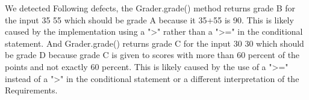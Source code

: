 \begin{parlist}
\item
We detected Following defects, the Grader.grade() method returns grade B for the input 35 55 which should be grade
A because it 35+55 is 90. This is likely caused by the implementation using a ">" rather than a ">=" in the conditional statement. And Grader.grade() returns grade C for the input 30 30 which should be grade
D because grade C is given to scores with more than 60 percent of the points and not exactly 60 percent. This is likely caused by the use of a ">=" instead of a ">" in the conditional statement or a different interpretation of the Requirements.

\end{parlist}

